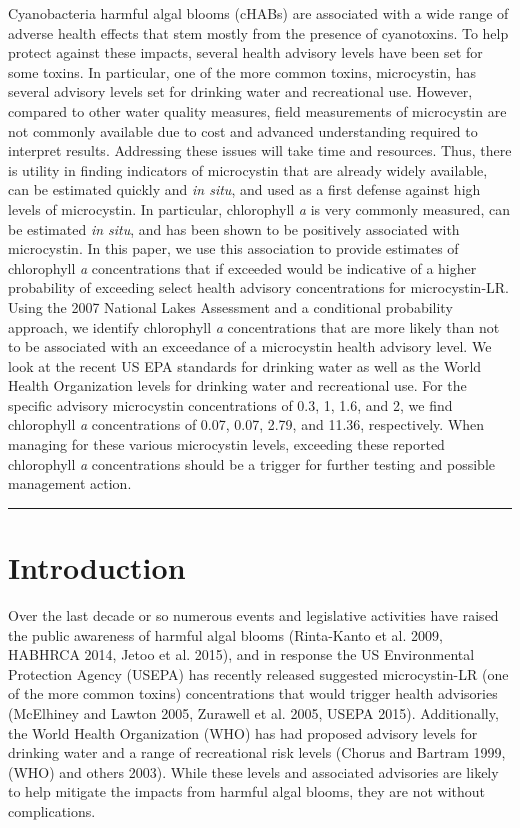 \documentclass[11pt,]{article}
\begin{document}
Cyanobacteria harmful algal blooms (cHABs) are associated with a wide
range of adverse health effects that stem mostly from the presence of
cyanotoxins. To help protect against these impacts, several health
advisory levels have been set for some toxins. In particular, one of the
more common toxins, microcystin, has several advisory levels set for
drinking water and recreational use. However, compared to other water
quality measures, field measurements of microcystin are not commonly
available due to cost and advanced understanding required to interpret
results. Addressing these issues will take time and resources. Thus,
there is utility in finding indicators of microcystin that are already
widely available, can be estimated quickly and \emph{in situ}, and used
as a first defense against high levels of microcystin. In particular,
chlorophyll \emph{a} is very commonly measured, can be estimated
\emph{in situ}, and has been shown to be positively associated with
microcystin. In this paper, we use this association to provide estimates
of chlorophyll \emph{a} concentrations that if exceeded would be
indicative of a higher probability of exceeding select health advisory
concentrations for microcystin-LR. Using the 2007 National Lakes
Assessment and a conditional probability approach, we identify
chlorophyll \emph{a} concentrations that are more likely than not to be
associated with an exceedance of a microcystin health advisory level. We
look at the recent US EPA standards for drinking water as well as the
World Health Organization levels for drinking water and recreational
use. For the specific advisory microcystin concentrations of 0.3, 1,
1.6, and 2, we find chlorophyll \emph{a} concentrations of 0.07, 0.07,
2.79, and 11.36, respectively. When managing for these various
microcystin levels, exceeding these reported chlorophyll \emph{a}
concentrations should be a trigger for further testing and possible
management action.

\vspace{3mm}

\hrule

\doublespace

\section{Introduction}\label{introduction}

Over the last decade or so numerous events and legislative activities
have raised the public awareness of harmful algal blooms (Rinta-Kanto et
al. 2009, HABHRCA 2014, Jetoo et al. 2015), and in response the US
Environmental Protection Agency (USEPA) has recently released suggested
microcystin-LR (one of the more common toxins) concentrations that would
trigger health advisories (McElhiney and Lawton 2005, Zurawell et al.
2005, USEPA 2015). Additionally, the World Health Organization (WHO) has
had proposed advisory levels for drinking water and a range of
recreational risk levels (Chorus and Bartram 1999, (WHO) and others
2003). While these levels and associated advisories are likely to help
mitigate the impacts from harmful algal blooms, they are not without
complications.
\end{document}
